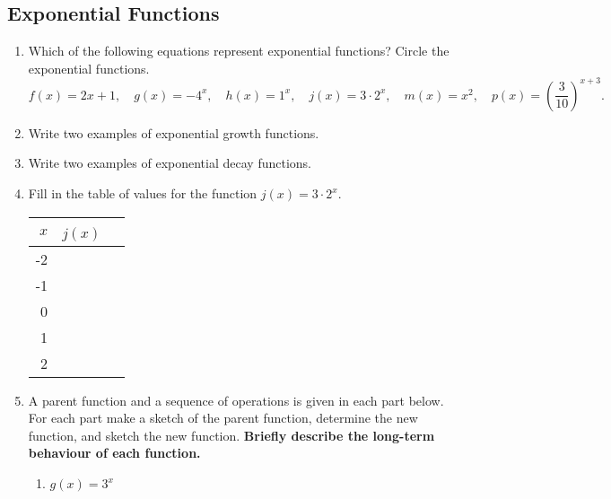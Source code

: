 \subsection{Exponential Functions}
\begin{enumerate}
\item Which of the following equations represent exponential
  functions?
  {Circle the exponential functions.}
  $$f(x)=2x+1, \quad
  g(x)=-4^x, \quad
  h(x)=1^x, \quad
  j(x)=3\cdot 2^x,  \quad
  m(x)=x^2,  \quad
  p(x)=\left(\frac{3}{10}\right)^{x+3}.$$

\item Write two examples of exponential growth functions.
\vfill

\item Write two examples of exponential decay functions.
\vfill

\item Fill in the table of values for the function $j(x)=3\cdot 2^x$.

\begin{center}
\begin{tabular}{|r|l|}
\hline
\textbf{$x$} & \textbf{$j(x)$~~} \\ \hline
-2           &                 \\ [0.5em] \hline
-1           &                 \\ [0.5em] \hline
0            &                 \\ [0.5em] \hline
1            &                 \\ [0.5em] \hline
2            &                 \\ [0.5em] \hline
\end{tabular}
\end{center}

\clearpage

\item A parent function and a sequence of operations is given in each
  part below. For each part make a sketch of the parent function,
  determine the new function, and sketch the new function. \textbf{Briefly
  describe the long-term behaviour of each function.}

  \begin{enumerate}
  \item $g(x)=3^x$

        \begin{tabular}{m{}m{}}


\end{tabular}
\end{enumerate}
\end{enumerate}
